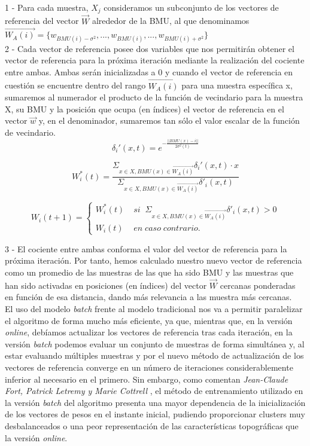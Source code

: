 1 - Para cada muestra, $X_j$ consideramos un subconjunto de los vectores de referencia del vector $\vec{W}$ alrededor de la BMU, al que denominamos $\vec{W_A(i)} = \{w_{BMU(i)-\sigma^2}, ..., w_{BMU(i)}, ..., w_{BMU(i)+ \sigma^2} \}$\\

2 - Cada vector de referencia posee dos variables que nos permitirán obtener el vector de referencia para la próxima iteración mediante la realización del cociente entre ambas. Ambas serán inicializadas a 0 y cuando el vector de referencia en cuestión se encuentre dentro del rango $\vec{W_A(i)}$ para una muestra específica x, sumaremos al numerador el producto de la función de vecindario para la muestra X, su BMU y la posición que ocupa (en índices) el vector de referencia en el vector $\vec{w}$ y, en el denominador, sumaremos tan sólo el valor escalar de la función de vecindario. \\

$$ \delta_{i}'(x, t) = e^{-\frac{||BMU(x) - i||}{2\sigma^2(t)}}$$

$$
W_{i}^{*}(t)= \frac{\Sigma_{x \in X, BMU(x) \in \vec{W_A(i)}}\delta_{i}'(x, t) \cdot x}{\Sigma_{x \in X, BMU(x) \in \vec{W_A(i)}}\delta'_{i}(x, t)}
$$

$$
W_{i}(t+1) = \left\{
\begin{array}{ll}
W_{i}^{*}(t) \; & si  \; \; {\Sigma_{x \in X, BMU(x) \in \vec{W_A(i)}}\delta'_{i}(x, t)} > 0 \\
W_{i}(t) & en \; caso \; contrario.
\end{array}
\right.
$$


3 - El cociente entre ambas conforma el valor del vector de referencia para la próxima iteración. Por tanto, hemos calculado nuestro nuevo vector de referencia como un promedio de las muestras de las que ha sido BMU y las muestras que han sido activadas en posiciones (en índices) del vector $\vec{W}$ cercanas ponderadas en función de esa distancia, dando más relevancia a las muestra más cercanas.\\
	

El uso del modelo \textit{batch} frente al modelo tradicional nos va a permitir paralelizar el algoritmo de forma mucho más eficiente, ya que, mientras que, en la versión \textit{online}, debíamos actualizar los vectores de referencia tras cada iteración, en la versión \textit{batch} podemos evaluar un conjunto de muestras de forma simultánea y, al estar evaluando múltiples muestras y por el nuevo método de actualización de los vectores de referencia converge en un número de iteraciones considerablemente inferior al necesario en el primero. Sin embargo, como comentan \textit{Jean-Claude Fort, Patrick Letremy y Marie Cottrell} \cite{compsom}, el método de entrenamiento utilizado en la versión \textit{batch} del algoritmo presenta una mayor dependencia de la inicialización de los vectores de pesos en el instante inicial, pudiendo proporcionar clusters muy desbalanceados o una peor representación de las características topográficas que la versión \textit{online}.

